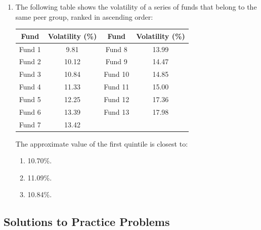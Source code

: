 \begin{enumerate}
	\item The following table shows the volatility of a series of funds that belong to the same peer group, ranked in ascending order:
	      \begin{center}
	      \begin{tabular}{|c|c||c|c|}
		      \hline
		      \textbf{Fund} & \textbf{Volatility (\%)} & \textbf{Fund} & \textbf{Volatility (\%)} \\
		      \hline
		      Fund 1 & 9.81 & Fund 8 & 13.99 \\
		      Fund 2 & 10.12 & Fund 9 & 14.47 \\
		      Fund 3 & 10.84 & Fund 10 & 14.85 \\
		      Fund 4 & 11.33 & Fund 11 & 15.00 \\
		      Fund 5 & 12.25 & Fund 12 & 17.36 \\
		      Fund 6 & 13.39 & Fund 13 & 17.98 \\
		      Fund 7 & 13.42 & & \\
		      \hline
	      \end{tabular}
	      \end{center}
	      The approximate value of the first quintile is closest to:
	      \begin{enumerate}[label=\Alph*.]
		      \item 10.70\%.
		      \item 11.09\%.
		      \item 10.84\%.
	      \end{enumerate}
\end{enumerate}

\subsection{Solutions to Practice Problems}
\label{subsec:app_Solutions_M5}

